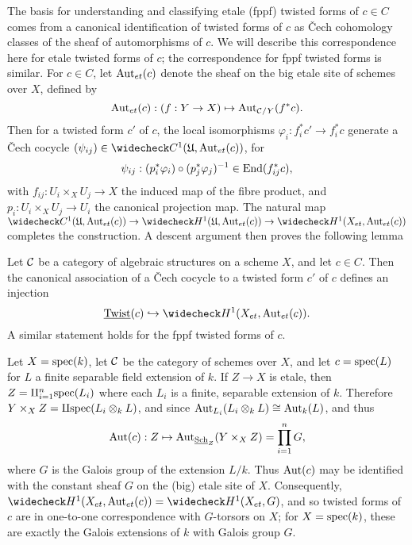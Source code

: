 The basis for understanding and classifying etale (fppf) twisted forms of $c\in C$ comes from a canonical identification of twisted forms of $c$ as \v{C}ech cohomology classes of the sheaf of automorphisms of $c$.  We will describe this correspondence here for etale twisted forms of $c$; the correspondence for fppf twisted forms is similar.  For $c\in C$, let $\textnormal{Aut}_{et}(c)$ denote the sheaf on the big etale site of schemes over $X$, defined by
$$\textnormal{Aut}_{et}(c): (f: Y\rightarrow X)\mapsto \textnormal{Aut}_{\mathcal{C}/Y}(f^*c).$$
Then for a twisted form $c'$ of $c$, the local isomorphisms $\varphi_i: f_i^*c'\rightarrow f_i^*c$ generate a \v{C}ech cocycle $(\psi_{ij})\in \wc{C}^1(\mathfrak U,\Aut_{et}(c))$, for
$$\psi_{ij}: (p_i^*\varphi_i)\circ(p_j^*\varphi_j)^{-1}\in \textnormal{End}(f_{ij}^*c),$$
with $f_{ij}: U_i\times_X U_j\rightarrow X$ the induced map of the fibre product, and $p_i: U_i\times_X U_j\rightarrow U_i$ the canonical projection map.  The natural map $\wc{C}^1(\mathfrak U,\Aut_{et}(c))\rightarrow \wc{H}^1(\mathfrak U,\Aut_{et}(c))\rightarrow\wc{H}^1(X_{et},\Aut_{et}(c))$ completes the construction.  A descent argument then proves the following lemma
\begin{lem}\label{twisted form lemma}
Let $\mathcal{C}$ be a category of algebraic structures on a scheme $X$, and let $c\in C$.  Then the canonical association of a \v{C}ech cocycle to a twisted form $c'$ of $c$ defines an injection
$$\twist(c)\hookrightarrow \wc{H}^1(X_{et},\Aut_{et}(c)).$$
A similar statement holds for the fppf twisted forms of $c$.
\end{lem}

\begin{ex}
Let $X = \textnormal{spec}(k)$, let $\mathcal{C}$ be the category of schemes over $X$, and let $c = \textnormal{spec}(L)$ for $L$ a finite separable field extension of $k$.  If $Z\rightarrow X$ is etale, then $Z = \amalg_{i=1}^n\textnormal{spec}(L_i)$ where each $L_i$ is a finite, separable extension of $k$.  Therefore $Y\times_X Z = \amalg \textnormal{spec}(L_i\otimes_k L)$, and since $\textnormal{Aut}_{L_i}(L_i\otimes_k L)\cong \textnormal{Aut}_k(L)$, and thus
$$\textnormal{Aut}(c): Z\mapsto \textnormal{Aut}_{\textnormal{\underline{Sch}}_Z}(Y\times_X Z) = \prod_{i=1}^nG,$$
where $G$ is the Galois group of the extension $L/k$.  Thus $\textnormal{Aut}(c)$ may be identified with the constant sheaf $G$ on the (big) etale site of $X$.  Consequently, $\wc{H}^1(X_{et},\Aut_{et}(c)) = \wc{H}^1(X_{et},G)$, and so twisted forms of $c$ are in one-to-one correspondence with $G$-torsors on $X$; for $X = \textnormal{spec}(k)$, these are exactly the Galois extensions of $k$ with Galois group $G$.
\end{ex}

